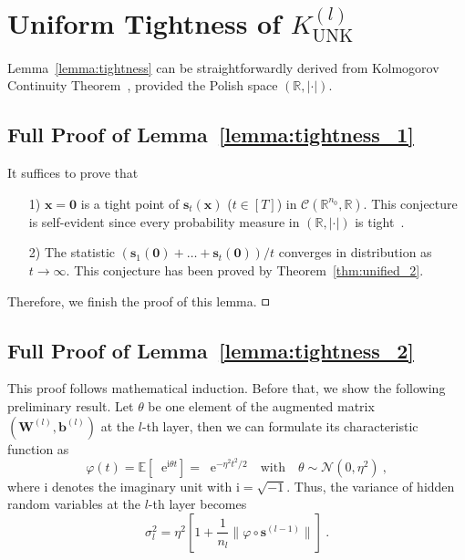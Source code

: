 \documentclass[review,10pt]{JMtemplate}
\newcommand*{\e}{\mathop{}\!\mathrm{e}}
\begin{document}
\section{Uniform Tightness of $K_{\textrm{UNK}}^{(l)}$} \label{app:tightness}
Lemma~\ref{lemma:tightness} can be straightforwardly derived from Kolmogorov Continuity Theorem~\cite{stroock1997:Kolmogorov}, provided the Polish space $(\mathbb{R}, |\cdot|)$. 

\subsection{Full Proof of Lemma~\ref{lemma:tightness_1}}
It suffices to prove that 
\begin{itemize}
    \item[1)] $\boldsymbol{x}=\boldsymbol{0}$ is a tight point of $\boldsymbol{s}_t(\boldsymbol{x})$ ($t \in [T]$) in $\mathcal{C}(\mathbb{R}^{n_0},\mathbb{R})$. This conjecture is self-evident since every probability measure in $(\mathbb{R}, |\cdot|)$ is tight~\cite{zhang2021:arise}.
    \item[2)] The statistic $(\boldsymbol{s}_1(\boldsymbol{0})+ \dots + \boldsymbol{s}_t(\boldsymbol{0})) / t$ converges in distribution as $t \to \infty$. This conjecture has been proved by Theorem~\ref{thm:unified_2}.
\end{itemize}
Therefore, we finish the proof of this lemma.  $\hfill\square$


\subsection{Full Proof of Lemma~\ref{lemma:tightness_2}}
This proof follows mathematical induction. Before that, we show the following preliminary result. Let $\theta$ be one element of the augmented matrix $(\mathbf{W}^{(l)}, \boldsymbol{b}^{(l)})$ at the $l$-th layer, then we can formulate its characteristic function as
\[
\varphi(t) = \mathbb{E}\left[ \e^{\mathrm{i}\theta t} \right] = \e^{-\eta^2 t^2/2} \quad\text{with}\quad \theta \sim \mathcal{N}(0,\eta^2) \ ,
\]
where $\mathrm{i}$ denotes the imaginary unit with $\mathrm{i} = \sqrt{-1}$. Thus, the variance of hidden random variables at the $l$-th layer becomes
\begin{equation} \label{eq:sigma}
	\sigma^2_l = \eta^2 \left[ 1 + \frac{1}{n_l}  \big\| \varphi \circ \boldsymbol{s}^{(l-1)} \big\| \right] \ .
\end{equation}
\end{document}
